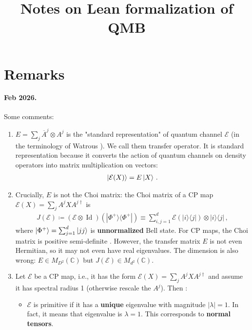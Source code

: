 \documentclass[11pt,letter,usenames,dvipsnames]{article}
\newcommand{\C}{\mathbb{C}}
\renewcommand{\bar}{\overline}
\DeclareMathOperator{\Id}{Id}
\newcommand{\ketbra}[2]{{|{#1}\rangle \!\langle {#2}|}}
\numberwithin{equation}{section}
\begin{document}
 
\title{Notes on Lean formalization of QMB}






\maketitle


\section{Remarks}


\paragraph{Feb 2026.} Some comments:
\begin{enumerate}[label=(\arabic*)]
    \item 
    $E = \sum_j \bar{A}^j\otimes A^j$ is the "standard representation" of quantum channel $\mathcal{E}$ (in the terminology of Watrous \cite[Chapter 2]{watrous2018theory}). We call them transfer operator. It is standard representation because it converts the action of quantum channels on density operators into matrix multiplication on vectors:
    \begin{align}
        \ket{\mathcal{E}(X)} = E\ket{X}\,.
    \end{align}
    
    \item Crucially, $E$ is not the Choi matrix: the Choi matrix of a CP map $\mathcal{E}(X) = \sum_jA^jXA^{j\dagger}$ is
    \begin{align}
        J(\mathcal{E})\coloneqq (\mathcal{E}\otimes \Id)(\ketbra{\Phi^+}{\Phi^+}) \equiv \sum_{i,j=1}^d\mathcal{E}(\ketbra{i}{j})\otimes\ketbra{i}{j}\,,
    \end{align}
    where $\ket{\Phi^+}=\sum_{j=1}^d\ket{jj}$ is \textbf{unnormalized} Bell state. For CP maps, the Choi matrix is positive semi-definite \cite{watrous2018theory}. However, the transfer matrix $E$ is not even Hermitian, so it may not even have real eigenvalues. The dimension is also wrong: $E\in M_{D^2}(\C)$ but $J(\mathcal{E})\in M_{d^2}(\C)$. 

    \item Let $\mathcal{E}$ be a CP map, i.e., it has the form $\mathcal{E}(X) = \sum_jA^jXA^{j\dagger}$ and assume it has spectral radius 1 (otherwise rescale the $A^j$). Then \cite{molnar2019thesis}:
    \begin{itemize}
        \item $\mathcal{E}$ is primitive if it has a \textbf{unique} eigenvalue with magnitude $|\lambda|=1$. In fact, it means that eigenvalue is $\lambda=1$. This corresponds to \textbf{normal tensors}. 


\end{itemize}
\end{enumerate}
\end{document}
